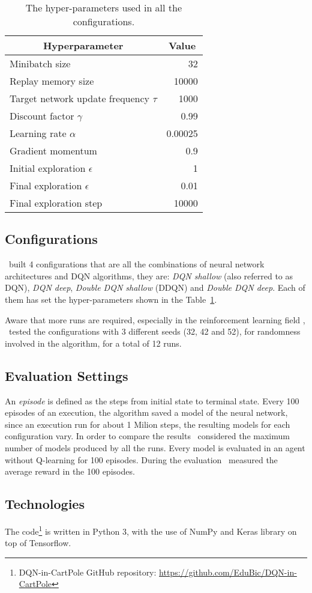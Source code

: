 \begin{table}
	\centering
	\begin{tabular}{|l|r|}
		\hline
		\multicolumn{1}{|c|}{\textbf{Hyperparameter}} &
		\multicolumn{1}{|c|}{\textbf{Value}}        \\
		\hline
		Minibatch size & 32 \\
		Replay memory size & 10000 \\
		Target network update frequency $\tau$ & 1000 \\
		Discount factor $\gamma$ & 0.99 \\
		Learning rate $\alpha$ & 0.00025 \\
		Gradient momentum & 0.9 \\
		Initial exploration $\epsilon$ & 1 \\
		Final exploration $\epsilon$ & 0.01 \\
		Final exploration step & 10000 \\
		\hline
	\end{tabular}
	
	\caption{The hyper-parameters used in all the configurations.}
	\label{tab:my-hyperparams}
\end{table}

\subsection{Configurations}

\Auth~built 4 configurations that are all the combinations of neural network architectures and DQN algorithms, they are: \textit{DQN shallow} (also referred to as DQN), \textit{DQN deep}, \textit{Double DQN shallow} (DDQN) and \textit{Double DQN deep}. Each of them has set the hyper-parameters shown in the Table~\ref{tab:my-hyperparams}.

Aware that more runs are required, especially in the reinforcement learning field \cite{DBLP:journals/corr/abs-1709-06560}, \auth~tested the configurations with 3 different seeds (32, 42 and 52), for randomness involved in the algorithm, for a total of 12 runs.


\subsection{Evaluation Settings}

An \textit{episode} is defined as the steps from initial state to terminal state. Every 100 episodes of an execution, the algorithm saved a model of the neural network, since an execution run for about 1 Milion steps, the resulting models for each configuration vary. In order to compare the results \auth~considered the maximum number of models produced by all the runs. Every model is evaluated in an agent without Q-learning for 100 episodes. During the evaluation \auth~measured the average reward in the 100 episodes.

\subsection{Technologies}
The code\footnote{DQN-in-CartPole GitHub repository: \url{https://github.com/EduBic/DQN-in-CartPole}} is written in Python 3, with the use of NumPy and Keras library on top of Tensorflow.





